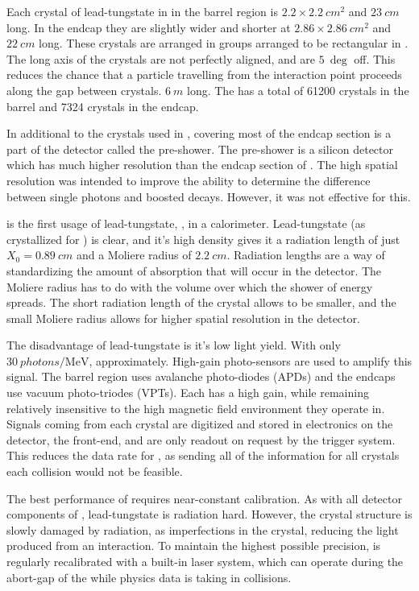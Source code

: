 Each crystal of lead-tungstate in \ECAL in the barrel region is \ensuremath{2.2\times \SI{2.2}{cm^2}} and \ensuremath{\SI{23}{cm}} long.  In the endcap they are slightly wider and shorter at \ensuremath{2.86\times \SI{2.86}{cm^2}} and \ensuremath{\SI{22}{cm}} long.  These crystals are arranged in \fivebyfive groups arranged to be rectangular in \etaphi.  The long axis of the crystals are not perfectly aligned, and are \ensuremath{\SI{5}{\deg}} off.  This reduces the chance that a particle travelling from the interaction point proceeds along the gap between crystals. \ensuremath{\SI{6}{m}} long.  The \ECAL has a total of 61200 crystals in the barrel and 7324 crystals in the endcap.

In additional to the crystals used in \ECAL, covering most of the endcap section is a part of the detector called the pre-shower.  The pre-shower is a silicon detector which has much higher resolution than the endcap section of \ECAL.  The high spatial resolution was intended to improve the ability to determine the difference between single photons and boosted \pitogammagamma decays.  However, it was not effective for this.

\ECAL is the first usage of lead-tungstate, \leadtungstate, in a calorimeter.  Lead-tungstate (as crystallized for \CMS) is clear, and it's high density gives it a radiation length of just \ensuremath{X_0 = \SI{0.89}{cm}} and a Moliere radius of \ensuremath{\SI{2.2}{cm}}.  Radiation lengths are a way of standardizing the amount of absorption that will occur in the detector.  The Moliere radius has to do with the volume over which the shower of energy spreads.  The short radiation length of the crystal allows \ECAL to be smaller, and the small Moliere radius allows for higher spatial resolution in the detector.

The disadvantage of lead-tungstate is it's low light yield.  With only \ensuremath{ \SI{30}{photons/\MeV}}, approximately.  High-gain photo-sensors are used to amplify this signal.  The barrel region uses avalanche photo-diodes (APDs) and the endcaps use vacuum photo-triodes (VPTs).  Each has a high gain, while remaining relatively insensitive to the high magnetic field environment they operate in.  Signals coming from each crystal are digitized and stored in electronics on the detector, the front-end, and are only readout on request by the \CMS trigger system.  This reduces the data rate for \ECAL, as sending all of the information for all crystals each collision would not be feasible.

The best performance of \ECAL requires near-constant calibration.  As with all detector components of \CMS, lead-tungstate is radiation hard.  However, the crystal structure is slowly damaged by radiation, as imperfections in the crystal, reducing the light produced from an interaction.  To maintain the highest possible precision, \ECAL is regularly recalibrated with a built-in laser system, which can operate during the abort-gap of the \LHC while physics data is taking in collisions.

